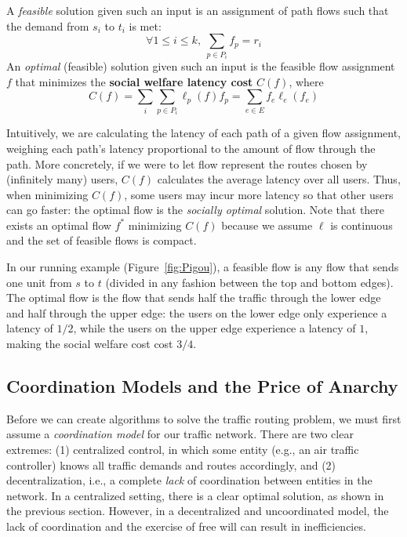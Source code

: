 A \emph{feasible} solution given such an input is an assignment of path flows such that the demand from $s_i$ to $t_i$ is met:
$$\forall 1 \le i \le k,~\sum_{p\in P_i} f_p = r_i$$
%
An \emph{optimal} (feasible) solution given such an input is the feasible flow assignment $f$ that minimizes the \textbf{social welfare latency cost} $C(f)$, where
$$C(f) = \sum_i\sum_{p\in P_i}\ell_p(f)f_p = \sum_{e\in E} f_e\ell_e(f_e)$$

Intuitively, we are calculating the latency of each path of a given flow assignment, weighing 
each path's latency proportional to the amount of flow through the path. More concretely,
if we were to let flow represent the routes chosen by (infinitely many) users, $C(f)$ calculates the average latency over all users. Thus, when minimizing $C(f)$, some users may incur 
more latency so that other users can go faster: the optimal flow is the \emph{socially optimal} solution.
Note that there exists an optimal flow $f^*$ minimizing $C(f)$ because we assume $\ell$ is continuous and the set of feasible flows is compact.

In our running example (Figure~\ref{fig:Pigou}), a feasible flow is any flow that sends one unit from $s$ to $t$ (divided in any fashion between the top and bottom edges).
The optimal flow is the flow that sends half the traffic through the lower edge and half through the upper edge: the users on the lower edge only experience a latency of $1/2$, while the users on the upper edge experience a latency of $1$, making the social welfare cost cost $3/4$.

\subsection{Coordination Models and the Price of Anarchy}
Before we can create algorithms to solve the traffic routing problem, we must first assume a \emph{coordination model} for our traffic network.
There are two clear extremes: (1) centralized control, in which some entity (e.g., an air traffic controller) knows all traffic demands and routes accordingly, and
(2) decentralization, i.e., a complete \emph{lack} of coordination between
entities in the network.
In a centralized setting, there is a clear optimal solution, as shown in the previous section.
However, in a decentralized and uncoordinated model, the lack of coordination and the exercise of free will can result in
inefficiencies. 

